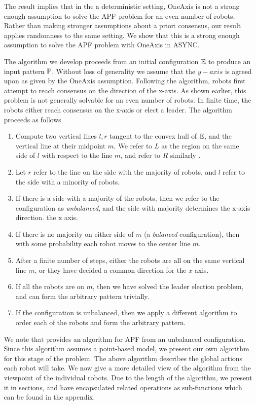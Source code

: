 \documentclass[preprint,10pt]{elsarticle}
\begin{document}
	The result implies that in the a deterministic setting, OneAxis is not a strong enough 
	assumption to solve the APF problem for an even number of robots. Rather than making 
	stronger assumptions about a priori consensus, our result applies randomness to the same setting. 
	We show that this is a strong enough assumption to solve the 
	APF problem with OneAxis in ASYNC. 

	The algorithm we develop proceeds from an initial configuration $\mathbb{E}$ to produce an input pattern $\mathbb{P}$.
	Without loss of generality we assume that the $y-axis$ is agreed upon as given by the OneAxis assumption.
	Following the algorithm, robots first attempt to reach consensus on the direction of the x-axis. 
	As shown earlier, this problem is not generally solvable for an even number of robots. In finite time, 
	the robots either reach consensus on the x-axis or elect a leader. The algorithm proceeds as follows
	\begin{enumerate}
		\item Compute two vertical lines $l,r$ tangent to the convex hull of $\mathbb{E}$, and the vertical line
		at their midpoint $m$. We refer to $L$ as the region on the same side of $l$ with respect to 
		the line $m$, and refer to $R$ similarly .
		\item Let $r$ refer to the line on the side with the majority of robots, and $l$ refer to the side
		with a minority of robots.
		\item If there is a side with a majority of the robots, then we refer to the configuration as
		\textit{unbalanced}, and the side with majority determines the x-axis direction.
		the x axis.
		\item If there is no majority on either side of $m$ (a \textit{balanced } configuration), 
		then with some probability each robot moves to the center line $m$. 
		\item After a finite number of steps, either the robots are all on the same vertical line $m$,
		or they have decided a common direction for the $x$ axis.
		\item If all the robots are on $m$, then we have solved the leader election problem, and 
		can form the arbitrary pattern trivially.
		\item If the configuration is unbalanced, then we apply a different algorithm to order each
		of the robots and form the arbitrary pattern.
	\end{enumerate}

	We note that \cite{flocchini12distrib} provides an algorithm for APF from an unbalanced configuration.
	Since this algorithm assumes a point-based model, we present our own algorithm for this stage of
	the problem. The above algorithm describes the global actions each robot will take. 
	We now give a more detailed view of the algorithm from the viewpoint of the individual robots.
	Due to the length of the algorithm, we present it in sections, and have encapsulated related 
	operations as sub-functions which can be found in the appendix.
\end{document}
